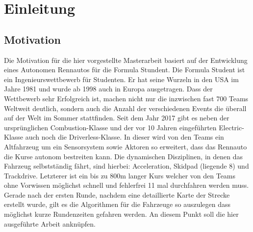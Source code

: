 \documentclass{like}
\begin{document}
  








\setcounter{page}{1}   %
\chapter{Einleitung}
\section{Motivation}
Die Motivation für die hier vorgestellte Masterarbeit basiert auf der Entwicklung eines Autonomen Rennautos für die Formula Stundent. 
Die Formula Student ist ein Ingenieurswettbewerb für Studenten. Er hat seine Wurzeln in den USA im Jahre 1981 und wurde ab 1998 auch in Europa ausgetragen.
Dass der Wettbewerb sehr Erfolgreich ist, machen nicht nur die inzwischen fast 700 Teams Weltweit \cite{FsWorldRank:1} deutlich, sondern auch die Anzahl der verschiedenen Events die überall auf der Welt im Sommer stattfinden. Seit dem Jahr 2017 gibt es neben der ursprünglichen Combustion-Klasse und der vor 10 Jahren eingeführten Electric-Klasse auch noch die Driverless-Klasse.
In dieser wird von den Teams ein Altfahrzeug um ein Sensorsystem sowie Aktoren so erweitert, dass das Rennauto die Kurse autonom bestreiten kann.
Die dynamischen Disziplinen, in denen das Fahrzeug selbstständig fährt, sind hierbei: Acceleration, Skidpad (liegende 8) und Trackdrive. Letzterer ist ein bis zu 800m langer Kurs welcher von den Teams ohne Vorwissen möglichst schnell und fehlerfrei 11 mal durchfahren werden muss. Gerade nach der ersten Runde, nachdem eine detaillierte Karte der Strecke erstellt wurde, gilt es die Algorithmen für die Fahrzeuge so auszulegen dass möglichst kurze Rundenzeiten gefahren werden. An diesem Punkt soll die hier ausgeführte Arbeit anknüpfen.
 

\section{}
\end{document}
